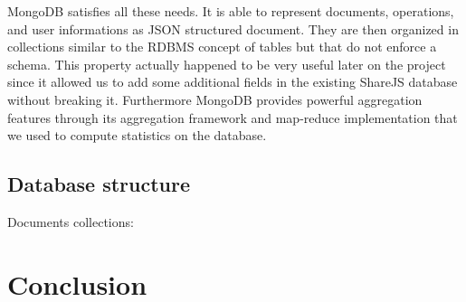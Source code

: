 \documentclass{llncs}
\begin{document}
MongoDB satisfies all these needs. It is able to represent documents, operations,
and user informations as JSON structured document. They are then organized in
collections similar to the RDBMS concept of tables but that do not enforce a schema.
This property actually happened to be very useful later on the project since it
allowed us to add some additional fields in the existing ShareJS database without
breaking it. Furthermore MongoDB provides powerful aggregation features through
its aggregation framework and map-reduce implementation that we used to compute
statistics on the database.

\subsection{Database structure}

Documents collections:
%
\section{Conclusion}\label{sec:Conclusion}
\end{document}
